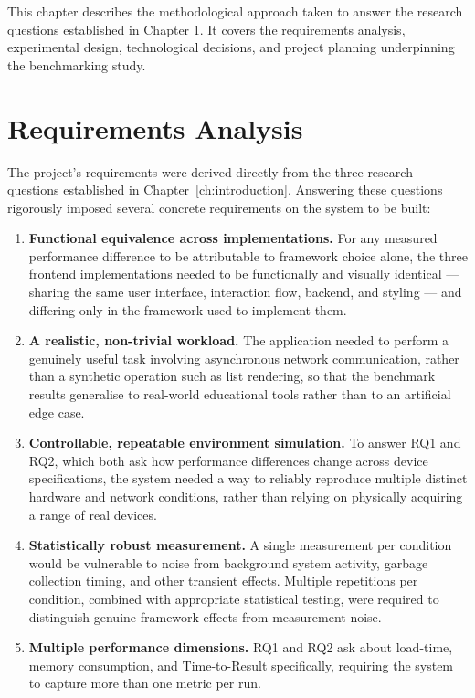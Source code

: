 \documentclass[11pt,a4paper]{report}
\begin{document}
This chapter describes the methodological approach taken to answer the research questions established in Chapter 1. It covers the requirements analysis, experimental design, technological decisions, and project planning underpinning the benchmarking study.

\section{Requirements Analysis}

The project's requirements were derived directly from the three research questions established in Chapter~\ref{ch:introduction}. Answering these questions rigorously imposed several concrete requirements on the system to be built: 

\begin{enumerate}
  \item \textbf{Functional equivalence across implementations.} For any measured performance difference to be attributable to framework choice alone, the three frontend implementations needed to be functionally and visually identical — sharing the same user interface, interaction flow, backend, and styling — and differing only in the framework used to implement them.
  \item \textbf{A realistic, non-trivial workload.} The application needed to perform a genuinely useful task involving asynchronous network communication, rather than a synthetic operation such as list rendering, so that the benchmark results generalise to real-world educational tools rather than to an artificial edge case.
  \item \textbf{Controllable, repeatable environment simulation.} To answer RQ1 and RQ2, which both ask how performance differences change across device specifications, the system needed a way to reliably reproduce multiple distinct hardware and network conditions, rather than relying on physically acquiring a range of real devices.
  \item \textbf{Statistically robust measurement.} A single measurement per condition would be vulnerable to noise from background system activity, garbage collection timing, and other transient effects. Multiple repetitions per condition, combined with appropriate statistical testing, were required to distinguish genuine framework effects from measurement noise.
  \item \textbf{Multiple performance dimensions.} RQ1 and RQ2 ask about load-time, memory consumption, and Time-to-Result specifically, requiring the system to capture more than one metric per run.
\end{enumerate}
\end{document}
